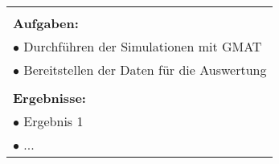 \begin{table}[!h]
\begin{center}
\begin{tabular}{|p{35mm}||p{55mm}|p{50mm}||p{40mm}|}
   \multicolumn{4}{|p{150mm}|}{}\\
   \multicolumn{4}{|p{150mm}|}{\textbf{Aufgaben:}}\\
   \multicolumn{4}{|p{150mm}|}{$\bullet$ Durchführen der Simulationen mit GMAT}\\
   \multicolumn{4}{|p{150mm}|}{$\bullet$ Bereitstellen der Daten für die Auswertung}\\
   \multicolumn{4}{|p{150mm}|}{}\\
   \multicolumn{4}{|p{150mm}|}{\textbf{Ergebnisse:}}\\
   \multicolumn{4}{|p{150mm}|}{$\bullet$ Ergebnis 1}\\
   \multicolumn{4}{|p{150mm}|}{$\bullet$ ...}\\
   \hline
  \end{tabular}
 \end{center}
\end{table}

